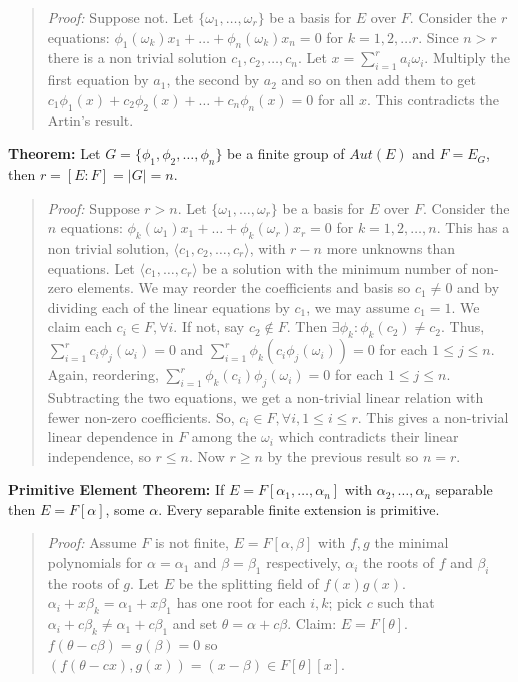 \begin{quote}
\emph{Proof:}  Suppose not. Let $\{ \omega_1, \ldots, \omega_r\}$
be a basis for $E$ over $F$. Consider the $r$ equations:
$\phi_1 (\omega_k) x_1 + \ldots + \phi_n(\omega_k) x_n = 0$ for $k= 1,2,\ldots r$.
Since $n>r$ there is a non trivial solution $c_1, c_2, \ldots , c_n$.  Let
$x= \sum_{i=1}^r a_i \omega_i$.  Multiply the first equation by $a_1$, the second by
$a_2$ and so on then add them to get
$c_{1} \phi_{1} (x) + c_2 \phi_2 (x) +  \ldots + c_n \phi_n (x)  = 0$
for all $x$.  This contradicts the Artin's result.
\end{quote}
{\bf Theorem:} 
Let $G= \{\phi_1 , \phi_2 , \ldots, \phi_n \}$ be a finite group of
$Aut(E)$ and $F = E_G$, then $r = [E:F] = |G| = n$.
\begin{quote}
\emph{Proof:}  Suppose $r>n$. Let $\{ \omega_1, \ldots, \omega_r\}$
be a basis for $E$ over $F$. Consider the $n$ equations:
$\phi_k (\omega_1) x_1 + \ldots + \phi_k(\omega_r) x_r = 0$ for $k= 1,2,\ldots, n$.
This has a non trivial solution, $\langle c_1, c_2, \ldots , c_r \rangle$,
with $r-n$ more unknowns than equations.  
Let $\langle c_1, \ldots , c_r \rangle$ be a solution with the minimum number of non-zero
elements. We may reorder the coefficients and basis so $c_1 \neq 0$ and by dividing each of
the linear equations by $c_1$, we may assume $c_1 = 1$.  We claim each $c_i \in F, \forall i$.
If not, say $c_2 \notin F$.  Then $\exists \phi_k: \phi_k(c_2) \neq c_2$.  Thus,
$\sum_{i=1}^r c_i \phi_j(\omega_i) = 0$ and 
$\sum_{i=1}^r \phi_k(c_i \phi_j(\omega_i)) = 0$ for each $ 1 \leq j \leq n$.  Again,
reordering, 
$\sum_{i=1}^r \phi_k(c_i) \phi_j(\omega_i) = 0$ for each $ 1 \leq j \leq n$.  Subtracting
the two equations, we get a non-trivial linear relation with fewer non-zero coefficients.
So, $c_i \in F, \forall i, 1 \leq i \leq r$.  This gives a non-trivial linear dependence 
in $F$ among the $\omega_i$ which contradicts their linear independence, so
$r \leq  n$.  Now $r \geq n$ by the previous result so $n=r$.
\end{quote}
{\bf Primitive Element Theorem: }
If $E=F[\alpha_1 , \ldots , \alpha_n]$ with $\alpha_2 , \ldots , \alpha_n$ separable then
$E=F[\alpha]$, some $\alpha$.  Every separable finite extension is primitive.
\begin{quote}
\emph{Proof:}  Assume $F$ is not finite, $E=F[\alpha, \beta]$ with $f, g$ the minimal polynomials
for $\alpha= \alpha_1$ and 
$\beta=\beta_1$ respectively, $\alpha_i$  the roots of $f$ and $\beta_i$ the roots of
$g$.  Let $E$ be the splitting field of $f(x)g(x)$.  
$\alpha_i + x \beta_k= \alpha_1 + x \beta_1$ 
has one root for each $i, k$; pick $c$ such that
$\alpha_i + c \beta_k \ne \alpha_1 + c \beta_1$ and set $\theta= \alpha + c \beta$.
Claim: $E=F[\theta]$. $f(\theta-c \beta)=g(\beta)=0$ so
$(f(\theta - cx), g(x))= (x- \beta) \in F[\theta][x]$. 
\end{quote}
